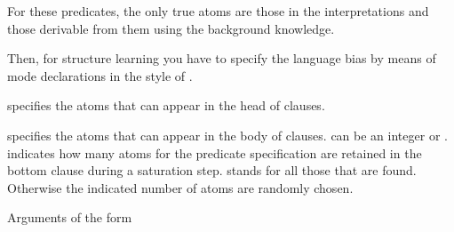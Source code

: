 \documentclass[letterpaper,10pt,english]{sphinxmanual}
\begin{document}
\begin{sphinxVerbatim}[commandchars=\\\{\}]
\end{sphinxVerbatim}

\sphinxAtStartPar
For these predicates, the only true atoms are those in the interpretations and those derivable from them using the background knowledge.

\sphinxAtStartPar
Then, for structure learning you have to specify the language bias by means of mode declarations in the style of .

\begin{sphinxVerbatim}[commandchars=\\\{\}]
\end{sphinxVerbatim}

\sphinxAtStartPar
specifies the atoms that can appear in the head of clauses.

\begin{sphinxVerbatim}[commandchars=\\\{\}]
\end{sphinxVerbatim}

\sphinxAtStartPar
specifies the atoms that can appear in the body of clauses.  can be an integer or \sphinxcode{\sphinxupquote{*}}.  indicates how many atoms for the predicate specification are retained in the bottom clause during a saturation step. \sphinxcode{\sphinxupquote{*}} stands for all those that are found.
Otherwise the indicated number of atoms are randomly chosen.

\sphinxAtStartPar
Arguments of the form

\begin{sphinxVerbatim}[commandchars=\\\{\}]
\end{sphinxVerbatim}
\end{document}
